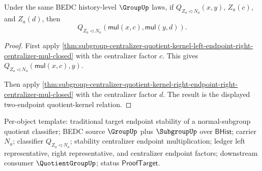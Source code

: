 \begin{theorem}
\label{thm:subgroup-centralizer-quotient-kernel-two-sided-centralizer-endpoint-mul-closed}
Under the same BEDC history-level $\GroupUp$ laws, if
$Q_{Z_a\triangleleft N_a}(x,y)$, $Z_a(c)$, and $Z_a(d)$, then
$$
Q_{Z_a\triangleleft N_a}(\mathsf{mul}(x,c),\mathsf{mul}(y,d)).
$$
\end{theorem}
\begin{proof}
First apply
\autoref{thm:subgroup-centralizer-quotient-kernel-left-endpoint-right-centralizer-mul-closed}
with the centralizer factor $c$. This gives
$Q_{Z_a\triangleleft N_a}(\mathsf{mul}(x,c),y)$.

Then apply
\autoref{thm:subgroup-centralizer-quotient-kernel-right-endpoint-right-centralizer-mul-closed}
with the centralizer factor $d$. The result is the displayed
two-endpoint quotient-kernel relation.
\end{proof}

Per-object template: traditional target endpoint stability of a
normal-subgroup quotient classifier; BEDC source $\GroupUp$ plus
$\SubgroupUp$ over $\mathsf{BHist}$; carrier $N_a$; classifier
$Q_{Z_a\triangleleft N_a}$; stability centralizer endpoint multiplication;
ledger left representative, right representative, and centralizer endpoint
factors; downstream consumer $\QuotientGroupUp$; status
$\mathsf{ProofTarget}$.
